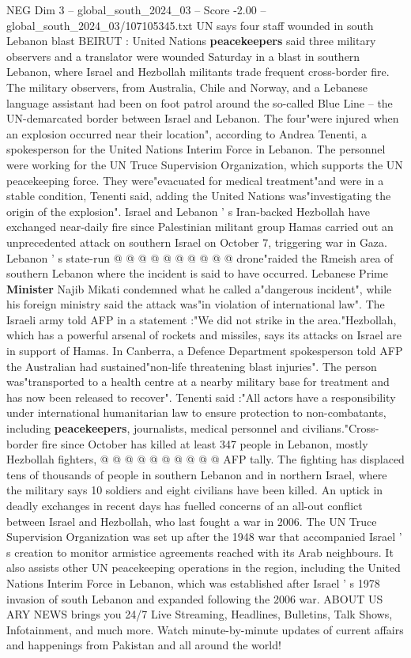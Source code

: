 \begin{textsample}{NEG Dim 3 – global\_south\_2024\_03 – Score -2.00 – global\_south\_2024\_03/107105345.txt}  \label{ex:f3_neg_041}
UN says four staff wounded in south Lebanon blast BEIRUT : United Nations \textbf{peacekeepers} said three military observers and a translator were wounded Saturday in a blast in southern Lebanon, where Israel and Hezbollah militants trade frequent cross-border fire.
The military observers, from Australia, Chile and Norway, and a Lebanese language assistant had been on foot patrol around the so-called Blue Line -- the UN-demarcated border between Israel and Lebanon.
The four"were injured when an explosion occurred near their location", according to Andrea Tenenti, a spokesperson for the United Nations Interim Force in Lebanon.
The personnel were working for the UN Truce Supervision Organization, which supports the UN peacekeeping force.
They were"evacuated for medical treatment"and were in a stable condition, Tenenti said, adding the United Nations was"investigating the origin of the explosion".
Israel and Lebanon ' s Iran-backed Hezbollah have exchanged near-daily fire since Palestinian militant group Hamas carried out an unprecedented attack on southern Israel on October 7, triggering war in Gaza.
Lebanon ' s state-run @ @ @ @ @ @ @ @ @ @ drone"raided the Rmeish area of southern Lebanon where the incident is said to have occurred.
Lebanese Prime \textbf{Minister} Najib Mikati condemned what he called a"dangerous incident", while his foreign ministry said the attack was"in violation of international law".
The Israeli army told AFP in a statement :"We did not strike in the area."Hezbollah, which has a powerful arsenal of rockets and missiles, says its attacks on Israel are in support of Hamas.
In Canberra, a Defence Department spokesperson told AFP the Australian had sustained"non-life threatening blast injuries".
The person was"transported to a health centre at a nearby military base for treatment and has now been released to recover".
Tenenti said :"All actors have a responsibility under international humanitarian law to ensure protection to non-combatants, including \textbf{peacekeepers}, journalists, medical personnel and civilians."Cross-border fire since October has killed at least 347 people in Lebanon, mostly Hezbollah fighters, @ @ @ @ @ @ @ @ @ @ AFP tally.
The fighting has displaced tens of thousands of people in southern Lebanon and in northern Israel, where the military says 10 soldiers and eight civilians have been killed.
An uptick in deadly exchanges in recent days has fuelled concerns of an all-out conflict between Israel and Hezbollah, who last fought a war in 2006.
The UN Truce Supervision Organization was set up after the 1948 war that accompanied Israel ' s creation to monitor armistice agreements reached with its Arab neighbours.
It also assists other UN peacekeeping operations in the region, including the United Nations Interim Force in Lebanon, which was established after Israel ' s 1978 invasion of south Lebanon and expanded following the 2006 war.
ABOUT US ARY NEWS brings you 24/7 Live Streaming, Headlines, Bulletins, Talk Shows, Infotainment, and much more.
Watch minute-by-minute updates of current affairs and happenings from Pakistan and all around the world!

\end{textsample}
